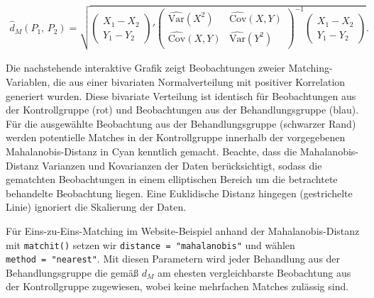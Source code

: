 \documentclass[
  a4paper,
  DIV=11,
  oneside]{scrreprt}
\begin{document}
\begin{align*}
  \widehat{d}_M(P_1,\,P_2) = \sqrt{
  \begin{pmatrix}
    X_1 - X_2\\
    Y_1 - Y_2
  \end{pmatrix}'
  \begin{pmatrix}
    \widehat{\text{Var}}(X^2) & \widehat{\text{Cov}}(X, Y) \\
     \widehat{\text{Cov}}(X, Y) & \widehat{\text{Var}}(Y^2) 
  \end{pmatrix}^{-1}
    \begin{pmatrix}
    X_1 - X_2\\
    Y_1 - Y_2
  \end{pmatrix}
}.
\end{align*}

Die nachstehende interaktive Grafik zeigt Beobachtungen zweier
Matching-Variablen, die aus einer bivariaten Normalverteilung mit
positiver Korrelation generiert wurden. Diese bivariate Verteilung ist
identisch für Beobachtungen aus der Kontrollgruppe (rot) und
Beobachtungen aus der Behandlungsgruppe (blau). Für die ausgewählte
Beobachtung aus der Behandlungsgruppe (schwarzer Rand) werden
potentielle Matches in der Kontrollgruppe innerhalb der vorgegebenen
Mahalanobis-Distanz in Cyan kenntlich gemacht. Beachte, dass die
Mahalanobis-Distanz Varianzen und Kovarianzen der Daten berücksichtigt,
sodass die gematchten Beobachtungen in einem elliptischen Bereich um die
betrachtete behandelte Beobachtung liegen. Eine Euklidische Distanz
hingegen (gestrichelte Linie) ignoriert die Skalierung der Daten.


Für Eins-zu-Eins-Matching im Website-Beispiel anhand der
Mahalanobis-Distanz mit \texttt{matchit()} setzen wir
\texttt{distance\ =\ "mahalanobis"} und wählen
\texttt{method\ =\ "nearest"}. Mit diesen Parametern wird jeder
Behandlung aus der Behandlungsgruppe die gemäß \(d_M\) am ehesten
vergleichbarste Beobachtung aus der Kontrollgruppe zugewiesen, wobei
keine mehrfachen Matches zulässig sind.
\end{document}
